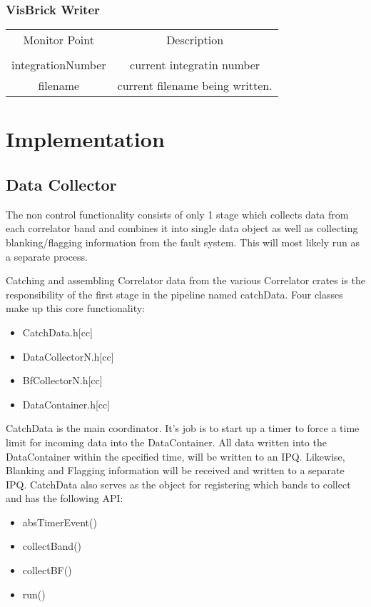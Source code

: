 \documentclass[11pt]{article}
\begin{document}
\subsubsection{VisBrick Writer}
\label{sec:vbmp}
\begin{center}
\begin{tabular}{|c|c|}
\hline
Monitor Point & Description \\
&\\
\hline\hline
integrationNumber  & current integratin number \\
filename           & current filename being written. \\
\hline
\end{tabular}
\end{center}


%
%
\section{Implementation}
%
%
\subsection{Data Collector}
The non control functionality consists of only 1 stage which collects data
from each correlator band and combines it into  single data object as well
as collecting blanking/flagging information from the fault system. This
will most likely run as a separate process.

Catching and assembling Correlator data from the various Correlator crates
is the responsibility of the first stage in the pipeline named catchData.
Four classes make up this core functionality:
\begin{itemize}
\item CatchData.h[cc]
\item DataCollectorN.h[cc]
\item BfCollectorN.h[cc]
\item DataContainer.h[cc]
\end{itemize}
CatchData is the main coordinator. It's job is to start up a timer to force
a time limit for incoming data into the DataContainer. All data written
into the DataContainer within the specified time, will be written to an
IPQ. Likewise, Blanking and Flagging information will be received and written
to a separate IPQ. CatchData also serves as the object for registering
which bands to collect and has the following API:
\begin{itemize}
\item absTimerEvent()
\item collectBand()
\item collectBF()
\item run()
\end{itemize}
\end{document}
